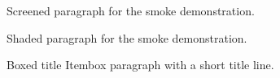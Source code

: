 \documentclass{article}
\begin{document}
\begin{screen}
Screened paragraph for the smoke demonstration.
\end{screen}
\begin{shadebox}
Shaded paragraph for the smoke demonstration.
\end{shadebox}
\begin{itembox}[l]{Boxed title}
Itembox paragraph with a short title line.
\end{itembox}
\end{document}
